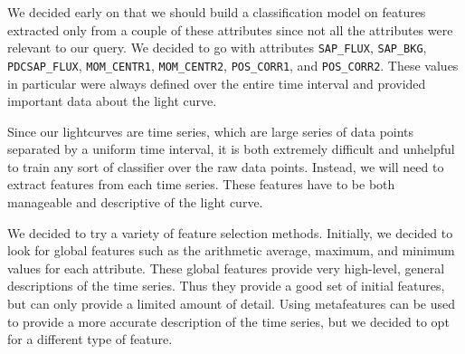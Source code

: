 \documentclass{amsart}
\begin{document}
We decided early on that we should build a classification model on features extracted only from a couple of these attributes since not all the attributes were relevant to our query. We decided to go with attributes \verb+SAP_FLUX+, \verb+SAP_BKG+, \verb+PDCSAP_FLUX+, \verb+MOM_CENTR1+, \verb+MOM_CENTR2+, \verb+POS_CORR1+, and \verb+POS_CORR2+. These values in particular were always defined over the entire time interval and provided important data about the light curve. 

Since our lightcurves are time series, which are large series of data points separated by a uniform time interval, it is both extremely difficult and unhelpful to train any sort of classifier over the raw data points. Instead, we will need to extract features from each time series. These features have to be both manageable and descriptive of the light curve.


We decided to try a variety of feature selection methods. Initially, we decided to look for global features such as the arithmetic average, maximum, and minimum values for each attribute. These global features provide very high-level, general descriptions of the time series. Thus they provide a good set of initial features, but can only provide a limited amount of detail. Using metafeatures can be used to provide a more accurate description of the time series, but we decided to opt for a different type of feature.
\end{document}

